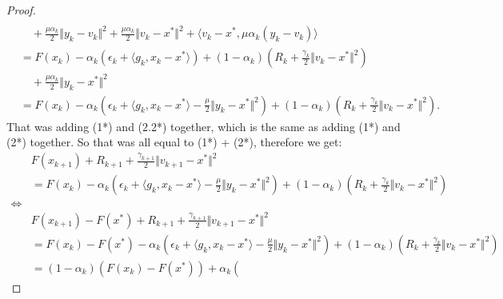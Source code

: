 \documentclass[12pt]{article}
\begin{document}
\begin{proof}
\begin{align*}
            \\ &\quad 
                + 
                \frac{\mu \alpha_k}{2}\Vert y_k - v_k\Vert^2
                + \frac{\mu \alpha_k}{2}\Vert v_k - x^*\Vert^2 
                + \langle v_k - x^*, \mu\alpha_k(y_k - v_k)\rangle
            \\ &=
            F(x_k) - \alpha_k(\epsilon_k + \langle g_k, x_k - x^*\rangle)
            + 
            (1 - \alpha_k)\left(
                R_k + \frac{\gamma_k}{2}\Vert v_k - x^*\Vert^2
            \right)
            \\ &\quad 
                +
                \frac{\mu\alpha_k}{2} \Vert y_k - x^*\Vert^2
            \\&= 
            F(x_k) - \alpha_k\left(
                \epsilon_k + \langle g_k, x_k - x^*\rangle
                - \frac{\mu}{2}\Vert y_k - x^*\Vert^2
            \right)
            + 
            (1 - \alpha_k)\left(
                R_k + \frac{\gamma_k}{2}\Vert v_k - x^*\Vert^2
            \right).
            \tag{3.1*}
        \end{align*}
        That was adding (1*) and (2.2*) together, which is the same as adding (1*) and (2*) together. 
        So that was all equal to (1*) + (2*), therefore we get: 
        {\small 
        \begin{align*}
            & F(x_{k + 1}) + R_{k + 1} + 
            \frac{\gamma_{k + 1}}{2}\Vert v_{k + 1} - x^*\Vert^2
            \\
            &= 
            F(x_k) - \alpha_k\left(
                \epsilon_k + \langle g_k, x_k - x^*\rangle
                - \frac{\mu}{2}\Vert y_k - x^*\Vert^2
            \right)
            + 
            (1 - \alpha_k)\left(
                R_k + \frac{\gamma_k}{2}\Vert v_k - x^*\Vert^2
            \right)
            \\
            \iff & 
            \\
            & F(x_{k + 1}) - F(x^*) + R_{k + 1} + 
            \frac{\gamma_{k + 1}}{2}\Vert v_{k + 1} - x^*\Vert^2
            \\
            &= 
            F(x_k) - F(x^*) - \alpha_k\left(
                \epsilon_k + \langle g_k, x_k - x^*\rangle
                - \frac{\mu}{2}\Vert y_k - x^*\Vert^2
            \right)
            + 
            (1 - \alpha_k)\left(
                R_k + \frac{\gamma_k}{2}\Vert v_k - x^*\Vert^2
            \right)
            \\
            &= (1 - \alpha_k)(F(x_k) - F(x^*))
            + \alpha_k\left(

\end{align*}}
\end{proof}
\end{document}
